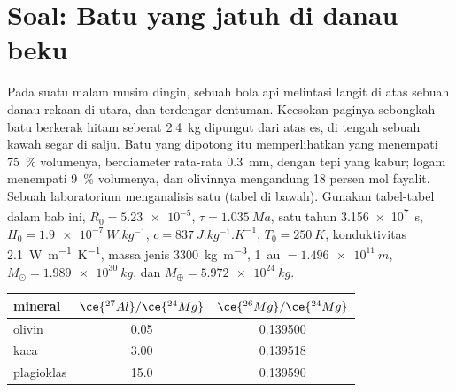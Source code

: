 \section{Soal: Batu yang jatuh di danau beku}

\begin{problem}
\label{pb:b2:planet-formation-meteorites:1}
Pada suatu malam musim dingin, sebuah bola api melintasi langit di atas sebuah danau rekaan di
utara, dan terdengar dentuman. Keesokan paginya sebongkah batu berkerak hitam seberat \qty{2.4}{kg}
dipungut dari atas es, di tengah sebuah kawah segar di salju. Batu yang
dipotong itu memperlihatkan  yang menempati \qty{75}{\percent} volumenya, berdiameter
rata-rata \qty{0.3}{mm}, dengan tepi yang kabur; logam menempati \qty{9}{\percent}
volumenya, dan olivinnya mengandung 18 persen mol fayalit. Sebuah laboratorium
menganalisis satu  (tabel di bawah). Gunakan tabel-tabel dalam bab ini,
$R_0 = \num{5.23e-5}$, $\tau = \qty{1.035}{Ma}$, satu tahun \qty{3.156e7}{s},
$H_0 = \qty{1.9e-7}{W.kg^{-1}}$, $c = \qty{837}{J.kg^{-1}.K^{-1}}$,
$T_0 = \qty{250}{K}$, konduktivitas \qty{2.1}{W.m^{-1}.K^{-1}}, massa jenis
\qty{3300}{kg.m^{-3}}, \qty{1}{au} $= \qty{1.496e11}{m}$,
$M_\odot = \qty{1.989e30}{kg}$, dan $M_\oplus = \qty{5.972e24}{kg}$.

\begin{center}
\small
\begin{tabular}{lcc}
\hline
mineral & $\ce{^{27}Al}/\ce{^{24}Mg}$ & $\ce{^{26}Mg}/\ce{^{24}Mg}$\\
\hline
olivin & 0.05 & \num{0.139500}\\
kaca & 3.00 & \num{0.139518}\\
plagioklas & 15.0 & \num{0.139590}\\
\hline
\end{tabular}
\end{center}


\end{problem}
